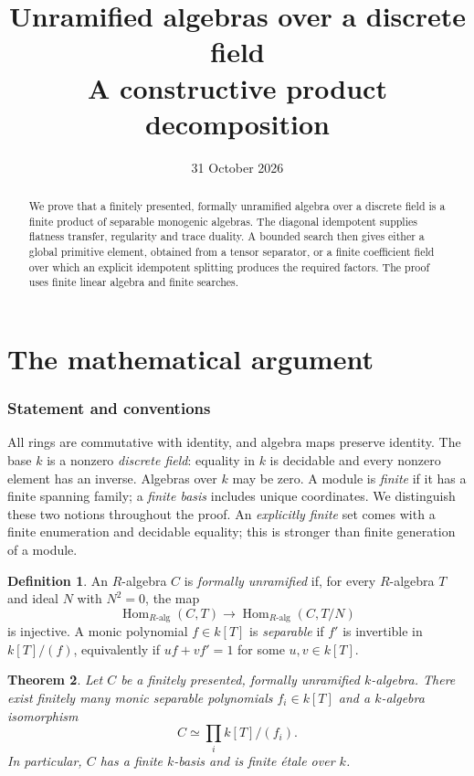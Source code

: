\documentclass[11pt]{article}
\title{Unramified algebras over a discrete field\\
\large A constructive product decomposition}
\author{}
\date{31 October 2026}
\newtheorem{theorem}{Theorem}[section]
\theoremstyle{definition}
\newtheorem{definition}[theorem]{Definition}
\theoremstyle{remark}
\begin{document}
\maketitle

\begin{abstract}
We prove that a finitely presented, formally unramified algebra over a
discrete field is a finite product of separable monogenic algebras.
The diagonal idempotent supplies flatness transfer, regularity and
trace duality. A bounded search then gives either a global primitive
element, obtained from a tensor separator, or a finite coefficient
field over which an explicit idempotent splitting produces the required
factors. The proof uses finite linear algebra and finite searches.
\end{abstract}

\part{The mathematical argument}

\section{Statement and conventions}

All rings are commutative with identity, and algebra maps preserve
identity. The base $k$ is a nonzero \emph{discrete field}: equality in
$k$ is decidable and every nonzero element has an inverse. Algebras
over $k$ may be zero. A module is \emph{finite} if it has a finite
spanning family; a \emph{finite basis} includes unique coordinates.
We distinguish these two notions throughout the proof.
An \emph{explicitly finite} set comes with a finite enumeration and
decidable equality; this is stronger than finite generation of a module.

\begin{definition}
An $R$-algebra $C$ is \emph{formally unramified} if, for every
$R$-algebra $T$ and ideal $N$ with $N^2=0$, the map
\[
 \operatorname{Hom}_{R\text{-alg}}(C,T)
 \longrightarrow \operatorname{Hom}_{R\text{-alg}}(C,T/N)
\]
is injective. A monic polynomial $f\in k[T]$ is \emph{separable} if
$f'$ is invertible in $k[T]/(f)$, equivalently if
$uf+vf'=1$ for some $u,v\in k[T]$.
\end{definition}

\begin{theorem}\label{thm:main}
Let $C$ be a finitely presented, formally unramified $k$-algebra.
There exist finitely many monic separable polynomials $f_i\in k[T]$
and a $k$-algebra isomorphism
\[
 C\simeq\prod_i k[T]/(f_i).
\]
In particular, $C$ has a finite $k$-basis and is finite \'etale over $k$.
\end{theorem}
\end{document}
